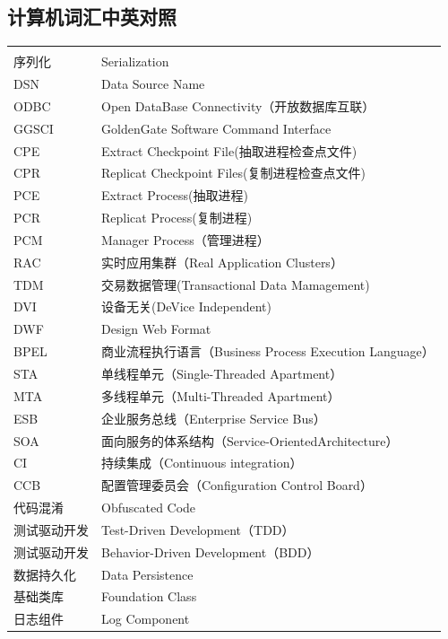 \documentclass{book}
\begin{document}
\clearpage

\subsection{计算机词汇中英对照}		

\begin{longtable}{lp{10cm}}
	\multirow{1}{*}{}			
	& \multicolumn{1}{c}{}\\
	序列化 & Serialization\\
	DSN & Data Source Name\\
	ODBC & Open DataBase Connectivity（开放数据库互联）\\
	GGSCI & GoldenGate Software Command Interface\\
	CPE & Extract Checkpoint File(抽取进程检查点文件)\\
	CPR & Replicat Checkpoint Files(复制进程检查点文件)\\
	PCE & Extract Process(抽取进程)\\
	PCR & Replicat Process(复制进程)\\
	PCM & Manager Process（管理进程）\\
	RAC & 实时应用集群（Real Application Clusters）\\
	TDM & 交易数据管理(Transactional Data Mamagement)\\
	DVI & 设备无关(DeVice Independent)\\
	DWF & Design Web Format\\
	BPEL & 商业流程执行语言（Business Process Execution Language）\\
	STA & 单线程单元（Single-Threaded Apartment）\\
	MTA & 多线程单元（Multi-Threaded Apartment）\\
	ESB & 企业服务总线（Enterprise Service Bus）\\
	SOA & 面向服务的体系结构（Service-OrientedArchitecture）\\
	CI & 持续集成（Continuous integration）\\
	CCB & 配置管理委员会（Configuration Control Board）\\
	代码混淆 & Obfuscated Code\\
	测试驱动开发 & Test-Driven Development（TDD）\\
	测试驱动开发 & Behavior-Driven Development（BDD）\\
	数据持久化 & Data Persistence\\
	基础类库 & Foundation Class\\
	日志组件 & Log Component\\

\end{longtable}
\end{document}

